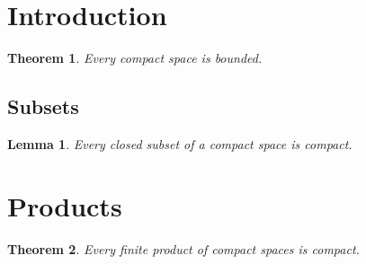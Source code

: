 \documentclass{article}
\newtheorem{lemma}{Lemma}[subsection]
\newtheorem{thm0}{Theorem}[section]
\begin{document}
\section{Introduction}
\begin{thm0} Every compact space is bounded. \end{thm0}
\subsection{Subsets}
\begin{lemma} Every closed subset of a compact space is compact. \end{lemma}
\section{Products}
\begin{thm0} Every finite product of compact spaces is compact. \end{thm0}
\end{document}
